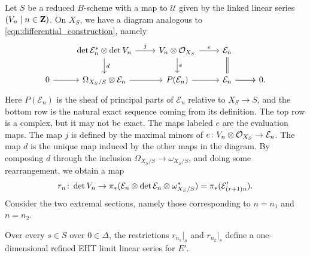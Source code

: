Let $S$ be a reduced $B$-scheme with a map to $\mathcal U$ given by the linked linear series $(V_n \mid n \in {\bf Z})$.
On $X_S$, we have a diagram analogous to \eqref{eqn:differential_construction}, namely
\begin{equation}
  \label{eq:llspr}
  \begin{tikzcd}
    &\det \mathcal E_n^* \otimes \det V_n\ar{r}{j}\ar{d}{d} & V_n \otimes \O_{X_S}\ar{r}{e}\ar{d}{e} & \mathcal E_n\ar[equal]{d}&\\
    0\ar{r} & \Omega_{X_S/S} \otimes \mathcal E_n\ar{r} & P(\mathcal E_n)\ar{r} &\ar{r} \mathcal E_n \ar{r}& 0.
  \end{tikzcd}
\end{equation}
Here $P(\mathcal E_n)$ is the sheaf of principal parts of $\mathcal E_n$ relative to $X_S \to S$, and the bottom row is the natural exact sequence coming from its definition.
The top row is a complex, but it may not be exact.
The maps labeled $e$ are the evaluation maps.
The map $j$ is defined by the maximal minors of $e {\colon} V_n \otimes \mathcal O_{X_S} \to \mathcal E_n$.
The map $d$ is the unique map induced by the other maps in the diagram.
By composing $d$ through the inclusion $\Omega_{X_S/S} \to \omega_{X_S/S}$, and doing some rearrangement, we obtain a map
\begin{equation}\label{eqn:Rn}
r_n {\colon} \det V_n \to \mathcal \pi_*(\mathcal E_n \otimes \det \mathcal E_n \otimes \omega^*_{X_S/S}) = \pi_*(\mathcal E'_{(r+1)n}).
\end{equation}
Consider the two extremal sections, namely those corresponding to $n = n_1$ and $n = n_2$.
\begin{lemma}\label{lem:rameht}
  Over every $s \in S$ over $0 \in \Delta$, the restrictions $r_{n_1}|_s$ and $r_{n_2}|_s$ define a one-dimensional refined EHT limit linear series for $E'$.
\end{lemma}
